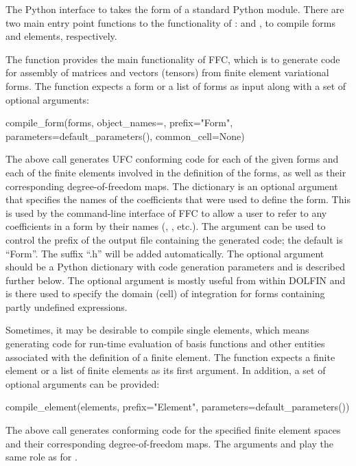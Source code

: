 The Python interface to \ffc{} takes the form of a standard
Python module. There are two main entry point functions to the
functionality of \ffc{}:  and
, to compile forms and elements, respectively.

The  function provides the main functionality of
FFC, which is to generate code for assembly of matrices and vectors
(tensors) from finite element variational
forms. The  function expects a form or a list of
forms as input along with a set of optional arguments:
%
\begin{python}
compile_form(forms,
             object_names={},
             prefix="Form",
             parameters=default_parameters(),
             common_cell=None)
\end{python}
%
The above call generates UFC conforming code for each of the given
forms and each of the finite elements involved in the definition of
the forms, as well as their corresponding degree-of-freedom
maps. The  dictionary is an optional argument that
specifies the names of the coefficients that were used to define the
form. This is used by the command-line interface of FFC to allow a
user to refer to any coefficients in a form by their names
(, , etc.). The  argument can be used to
control the prefix of the output file containing the generated code;
the default is ``Form''. The suffix ``.h'' will be added
automatically. The optional argument  should be a
Python dictionary with code generation parameters and is described
further below.  The optional argument  is mostly
useful from within DOLFIN and is there used to specify the domain
(cell) of integration for forms containing partly undefined
expressions.

Sometimes, it may be desirable to compile single elements, which means
generating code for run-time evaluation of basis functions and other
entities associated with the definition of a finite element.
The  function expects a finite element or a list
of finite elements as its first argument. In addition, a set of
optional arguments can be provided:
%
\begin{python}
compile_element(elements,
                prefix="Element",
                parameters=default_parameters())
\end{python}
%
The above call generates \ufc{} conforming code for the specified
finite element spaces and their corresponding degree-of-freedom maps.
The arguments  and
 play the same role as for
.

